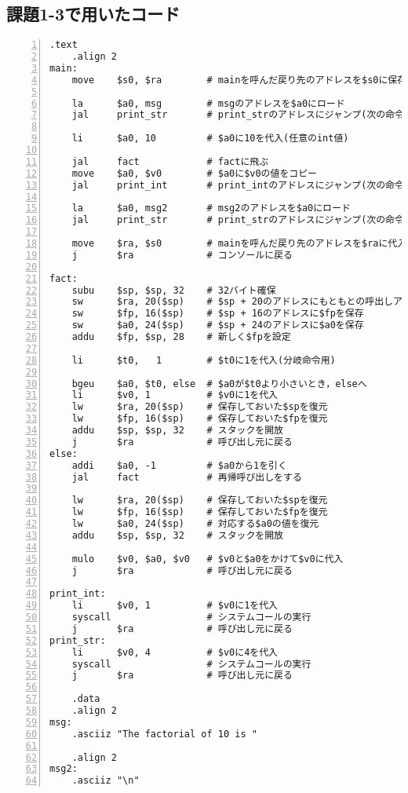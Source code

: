 \subsection{課題1-3で用いたコード} \label{sec:p1-3}
\begin{Verbatim}[numbers=left, xleftmargin=10mm, numbersep=6pt,
                    fontsize=\small, baselinestretch=0.8]
    .text
    .align 2
main:
    move    $s0, $ra        # mainを呼んだ戻り先のアドレスを$s0に保存しておく

    la      $a0, msg        # msgのアドレスを$a0にロード
    jal     print_str       # print_strのアドレスにジャンプ(次の命令のアドレスを$raに)

    li      $a0, 10         # $a0に10を代入(任意のint値)

    jal     fact            # factに飛ぶ
    move    $a0, $v0        # $a0に$v0の値をコピー
    jal     print_int       # print_intのアドレスにジャンプ(次の命令のアドレスを$raに)

    la      $a0, msg2       # msg2のアドレスを$a0にロード
    jal     print_str       # print_strのアドレスにジャンプ(次の命令のアドレスを$raに)

    move    $ra, $s0        # mainを呼んだ戻り先のアドレスを$raに代入
    j       $ra             # コンソールに戻る

fact:
    subu    $sp, $sp, 32    # 32バイト確保
    sw      $ra, 20($sp)    # $sp + 20のアドレスにもともとの呼出しアドレスを保存
    sw      $fp, 16($sp)    # $sp + 16のアドレスに$fpを保存
    sw      $a0, 24($sp)    # $sp + 24のアドレスに$a0を保存
    addu    $fp, $sp, 28    # 新しく$fpを設定

    li      $t0,   1        # $t0に1を代入(分岐命令用)

    bgeu    $a0, $t0, else  # $a0が$t0より小さいとき，elseへ
    li      $v0, 1          # $v0に1を代入
    lw      $ra, 20($sp)    # 保存しておいた$spを復元
    lw      $fp, 16($sp)    # 保存しておいた$fpを復元
    addu    $sp, $sp, 32    # スタックを開放
    j       $ra             # 呼び出し元に戻る
else:
    addi    $a0, -1         # $a0から1を引く
    jal     fact            # 再帰呼び出しをする

    lw      $ra, 20($sp)    # 保存しておいた$spを復元
    lw      $fp, 16($sp)    # 保存しておいた$fpを復元
    lw      $a0, 24($sp)    # 対応する$a0の値を復元
    addu    $sp, $sp, 32    # スタックを開放

    mulo    $v0, $a0, $v0   # $v0と$a0をかけて$v0に代入
    j       $ra             # 呼び出し元に戻る

print_int:
    li      $v0, 1          # $v0に1を代入
    syscall                 # システムコールの実行
    j       $ra             # 呼び出し元に戻る
print_str:
    li      $v0, 4          # $v0に4を代入
    syscall                 # システムコールの実行
    j       $ra             # 呼び出し元に戻る

    .data
    .align 2
msg:
    .asciiz "The factorial of 10 is "

    .align 2
msg2:
    .asciiz "\n"
\end{Verbatim}

